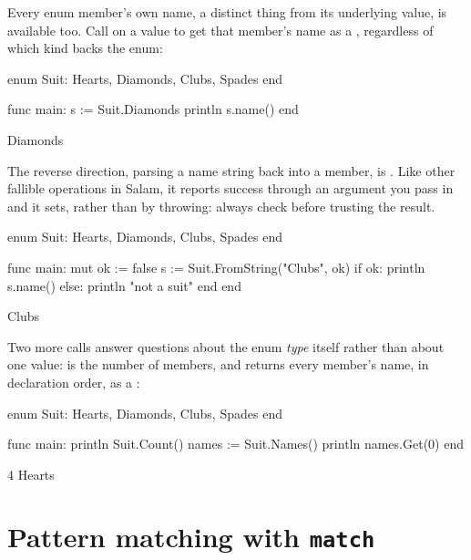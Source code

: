 Every enum member's own name, a distinct thing from its underlying value, is
available too. Call  on a value to get that member's name as a
, regardless of which kind backs the enum:

\begin{salamen}
enum Suit: Hearts, Diamonds, Clubs, Spades end

func main:
    s := Suit.Diamonds
    println s.name()
end
\end{salamen}

\begin{progout}
Diamonds
\end{progout}

The reverse direction, parsing a name string back into a member, is
. Like other fallible operations in Salam,
it reports success through an  argument you pass in and it sets,
rather than by throwing: always check  before trusting the result.

\begin{salamen}
enum Suit: Hearts, Diamonds, Clubs, Spades end

func main:
    mut ok := false
    s := Suit.FromString("Clubs", ok)
    if ok:
        println s.name()
    else:
        println "not a suit"
    end
end
\end{salamen}

\begin{progout}
Clubs
\end{progout}

Two more calls answer questions about the enum \emph{type} itself rather than
about one value:  is the number of members, and
 returns every member's name, in declaration order, as
a :

\begin{salamen}
enum Suit: Hearts, Diamonds, Clubs, Spades end

func main:
    println Suit.Count()
    names := Suit.Names()
    println names.Get(0)
end
\end{salamen}

\begin{progout}
4
Hearts
\end{progout}

\section{Pattern matching with \texttt{match}}

